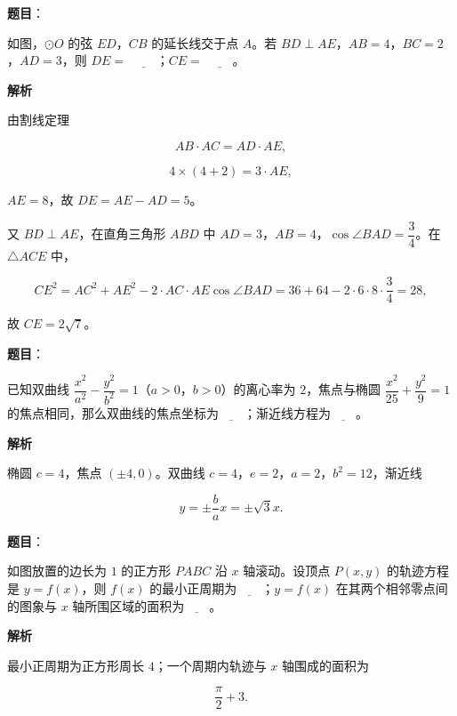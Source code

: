 \begin{answer}

\textbf{题目}：

如图，$\odot O$ 的弦 $ED$，$CB$ 的延长线交于点 $A$。若 $BD\perp AE$，$AB=4$，$BC=2$，$AD=3$，则 $DE=$ $\underline{\qquad}$；$CE=$ $\underline{\qquad}$。
\nopagebreak[4]
\begin{center}\end{center}
\nopagebreak[4]
\textbf{解析}

由割线定理

\nopagebreak[4]
\[AB\cdot AC=AD\cdot AE,\]

\nopagebreak[4]
\[4\times(4+2)=3\cdot AE,\]

$AE=8$，故 $DE=AE-AD=5$。

又 $BD\perp AE$，在直角三角形 $ABD$ 中 $AD=3$，$AB=4$，$\cos\angle BAD=\dfrac34$。在 $\triangle ACE$ 中，

\nopagebreak[4]
\[CE^2=AC^2+AE^2-2\cdot AC\cdot AE\cos\angle BAD
=36+64-2\cdot6\cdot8\cdot\frac34=28,\]

故 $CE=2\sqrt7$。


\end{answer}
\begin{answer}

\textbf{题目}：

已知双曲线 $\dfrac{x^2}{a^2}-\dfrac{y^2}{b^2}=1$（$a>0$，$b>0$）的离心率为 $2$，焦点与椭圆 $\dfrac{x^2}{25}+\dfrac{y^2}9=1$ 的焦点相同，那么双曲线的焦点坐标为$\underline{\qquad}$；渐近线方程为$\underline{\qquad}$。

\textbf{解析}

椭圆 $c=4$，焦点 $(\pm4,0)$。双曲线 $c=4$，$e=2$，$a=2$，$b^2=12$，渐近线

\nopagebreak[4]
\[y=\pm\frac ba x=\pm\sqrt3x.\]


\end{answer}
\begin{answer}

\textbf{题目}：

如图放置的边长为 $1$ 的正方形 $PABC$ 沿 $x$ 轴滚动。设顶点 $P(x,y)$ 的轨迹方程是 $y=f(x)$，则 $f(x)$ 的最小正周期为$\underline{\qquad}$；$y=f(x)$ 在其两个相邻零点间的图象与 $x$ 轴所围区域的面积为$\underline{\qquad}$。
\nopagebreak[4]
\begin{center}\end{center}
\nopagebreak[4]
\textbf{解析}

最小正周期为正方形周长 $4$；一个周期内轨迹与 $x$ 轴围成的面积为

\nopagebreak[4]
\[\frac\pi2+3.\]


\end{answer}
